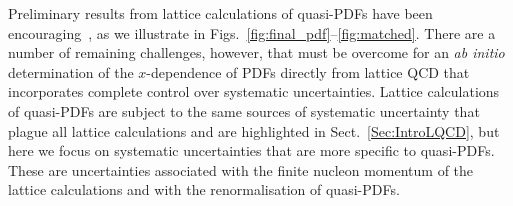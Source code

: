 Preliminary results from lattice calculations of quasi-PDFs have been encouraging~\cite{Lin:2014zya,Alexandrou:2015rja,Chen:2016utp,Alexandrou:2016jqi}, as we illustrate in Figs.~\ref{fig:final_pdf}--\ref{fig:matched}. There are a number of remaining challenges, however, that must be overcome for an {\it ab initio} determination of the $x$-dependence of PDFs directly from lattice QCD that incorporates complete control over systematic uncertainties. Lattice calculations of quasi-PDFs are subject to the same sources of systematic uncertainty that plague all lattice calculations and are highlighted in Sect.~\ref{Sec:IntroLQCD}, but here we focus on systematic uncertainties that are more specific to quasi-PDFs. These are uncertainties associated with the finite nucleon momentum of the lattice calculations and with the renormalisation of quasi-PDFs.

